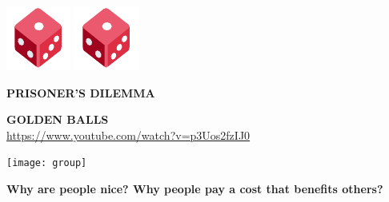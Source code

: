 \documentclass{beamer}
\begin{document}
\begin{frame}
    \centering
\end{frame}

\begin{frame}
    \centering
    \includegraphics[width=.2\textwidth]{guess} \hspace{.6cm}
    \includegraphics[width=.2\textwidth]{guess} \hspace{.6cm}
\end{frame}

\begin{frame}
    \centering
    \huge {\textbf{PRISONER'S DILEMMA}}
\end{frame}

\begin{frame}
    \centering
    
\end{frame}

\begin{frame}
    \centering
    \huge {\textbf{GOLDEN BALLS}} \\
    \large{\url{https://www.youtube.com/watch?v=p3Uos2fzIJ0}}
\end{frame}

\begin{frame}
    \centering
    \texttt{[image: group]}
\end{frame}

\begin{frame}
    \centering
    \Large {\textbf{Why are people nice? Why people pay a cost that benefits others?}}
\end{frame}
\end{document}
